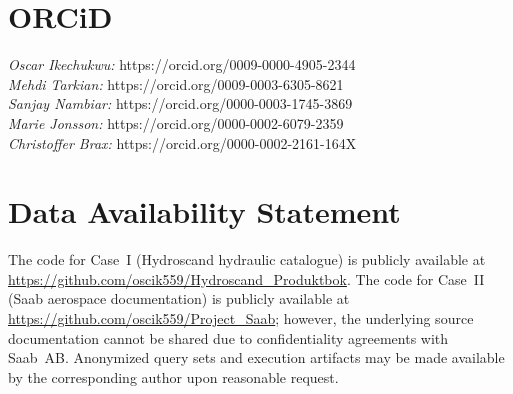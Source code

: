 \documentclass[largeformat]{interact}
\begin{document}
\section*{ORCiD}
\textit{Oscar Ikechukwu:}   https://orcid.org/0009-0000-4905-2344\\
\textit{Mehdi Tarkian:}   https://orcid.org/0009-0003-6305-8621\\
\textit{Sanjay Nambiar:}   https://orcid.org/0000-0003-1745-3869\\
\textit{Marie Jonsson:}  https://orcid.org/0000-0002-6079-2359\\
\textit{Christoffer Brax:}  https://orcid.org/0000-0002-2161-164X
\section*{Data Availability Statement}
\noindent The code for Case~I (Hydroscand hydraulic catalogue) is publicly available at \url{https://github.com/oscik559/Hydroscand_Produktbok}. The code for Case~II (Saab aerospace documentation) is publicly available at \url{https://github.com/oscik559/Project_Saab}; however, the underlying source documentation cannot be shared due to confidentiality agreements with Saab~AB. Anonymized query sets and execution artifacts may be made available by the corresponding author upon reasonable request.


\clearpage
\appendix
\renewcommand{\thesection}{\Alph{section}}
\renewcommand{\thesubsection}{\thesection.\arabic{subsection}}
\renewcommand{\thetable}{\thesection.\arabic{table}}
\setcounter{section}{0}

\newpage
\end{document}
